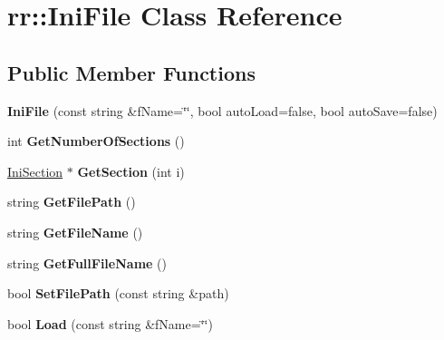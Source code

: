 \hypertarget{classrr_1_1_ini_file}{\section{rr\-:\-:Ini\-File Class Reference}
\label{classrr_1_1_ini_file}
}
\subsection*{Public Member Functions}
\begin{DoxyCompactItemize}
\item 
\hypertarget{classrr_1_1_ini_file_ab792ef51065dfdf4141b81bb2add44c7}{{\bfseries Ini\-File} (const string \&f\-Name=\char`\"{}\char`\"{}, bool auto\-Load=false, bool auto\-Save=false)}\label{classrr_1_1_ini_file_ab792ef51065dfdf4141b81bb2add44c7}

\item 
\hypertarget{classrr_1_1_ini_file_ac108ffabaf9a9b9effc96a99453a16b1}{int {\bfseries Get\-Number\-Of\-Sections} ()}\label{classrr_1_1_ini_file_ac108ffabaf9a9b9effc96a99453a16b1}

\item 
\hypertarget{classrr_1_1_ini_file_a8236e6ce6a56429276b25060d5e36f08}{\hyperlink{classrr_1_1_ini_section}{Ini\-Section} $\ast$ {\bfseries Get\-Section} (int i)}\label{classrr_1_1_ini_file_a8236e6ce6a56429276b25060d5e36f08}

\item 
\hypertarget{classrr_1_1_ini_file_ab59fe8169dc21705f942819eb61cecbc}{string {\bfseries Get\-File\-Path} ()}\label{classrr_1_1_ini_file_ab59fe8169dc21705f942819eb61cecbc}

\item 
\hypertarget{classrr_1_1_ini_file_a4584f793b8d33c4849bc4694ce2a38c5}{string {\bfseries Get\-File\-Name} ()}\label{classrr_1_1_ini_file_a4584f793b8d33c4849bc4694ce2a38c5}

\item 
\hypertarget{classrr_1_1_ini_file_a81951d80e536625d8bd2204f6e58e6df}{string {\bfseries Get\-Full\-File\-Name} ()}\label{classrr_1_1_ini_file_a81951d80e536625d8bd2204f6e58e6df}

\item 
\hypertarget{classrr_1_1_ini_file_ac3bda93be399fa98a50685d3be10a41d}{bool {\bfseries Set\-File\-Path} (const string \&path)}\label{classrr_1_1_ini_file_ac3bda93be399fa98a50685d3be10a41d}

\item 
\hypertarget{classrr_1_1_ini_file_afcde82ef7aab2e4cf68b67ff54abdf9b}{bool {\bfseries Load} (const string \&f\-Name=\char`\"{}\char`\"{})}\label{classrr_1_1_ini_file_afcde82ef7aab2e4cf68b67ff54abdf9b}


\end{DoxyCompactItemize}
